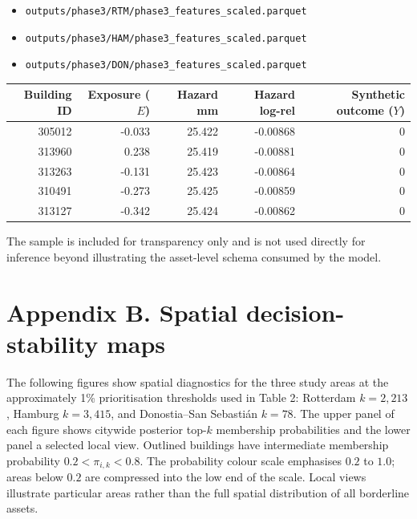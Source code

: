 \documentclass[
]{article}
\providecommand{\tightlist}{%
  \setlength{\itemsep}{0pt}\setlength{\parskip}{0pt}}
\begin{document}
\begin{itemize}
\tightlist
\item
  \texttt{outputs/phase3/RTM/phase3\_features\_scaled.parquet}
\item
  \texttt{outputs/phase3/HAM/phase3\_features\_scaled.parquet}
\item
  \texttt{outputs/phase3/DON/phase3\_features\_scaled.parquet}
\end{itemize}

\begin{table}[H]
\centering
\small
\begin{tabular}{rrrrr}
\toprule
Building ID & Exposure ($E$) & Hazard mm & Hazard log-rel & Synthetic outcome ($Y$) \\
\midrule
305012 & -0.033 & 25.422 & -0.00868 & 0 \\
313960 & 0.238 & 25.419 & -0.00881 & 0 \\
313263 & -0.131 & 25.423 & -0.00864 & 0 \\
310491 & -0.273 & 25.425 & -0.00859 & 0 \\
313127 & -0.342 & 25.424 & -0.00862 & 0 \\
\bottomrule
\end{tabular}
\end{table}

The sample is included for transparency only and is not used directly
for inference beyond illustrating the asset-level schema consumed by the
model.

\clearpage

\section{Appendix B. Spatial decision-stability
maps}\label{appendix-b.-spatial-decision-stability-maps}

The following figures show spatial diagnostics for the three study areas
at the approximately 1\% prioritisation thresholds used in Table 2:
Rotterdam \(k=2{,}213\), Hamburg \(k=3{,}415\), and Donostia--San
Sebastián \(k=78\). The upper panel of each figure shows citywide
posterior top-\(k\) membership probabilities and the lower panel a
selected local view. Outlined buildings have intermediate membership
probability \(0.2<\pi_{i,k}<0.8\). The probability colour scale
emphasises \(0.2\) to \(1.0\); areas below \(0.2\) are compressed into
the low end of the scale. Local views illustrate particular areas rather
than the full spatial distribution of all borderline assets.
\end{document}
